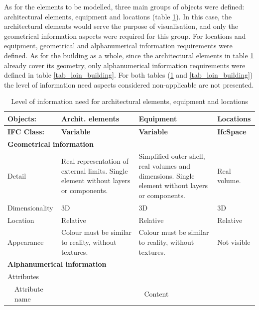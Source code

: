 \documentclass[a4paper, 10pt, twocolumn, twoside]{article}
\begin{document}
As for the elements to be modelled, three main groups of objects were defined: architectural elements, equipment and locations (table \ref{tab_loin_equipment}). In this case, the architectural elements would serve the purpose of visualisation, and only the geometrical information aspects were required for this group. For locations and equipment, geometrical and alphanumerical information requirements were defined. As for the building as a whole, since the architectural elements in table \ref{tab_loin_equipment} already cover its geometry, only alphanumerical information requirements were defined in table \ref{tab_loin_building}. For both tables (\ref{tab_loin_equipment} and \ref{tab_loin_building}) the level of information need aspects \cite{17412-1} considered non-applicable are not presented.

\begin{table}[!htb]
    \renewcommand{\arraystretch}{2}
    \centering
    \caption{Level of information need for architectural elements, equipment and locations}
    \label{tab_loin_equipment}
    \begin{tabular}{p{0.8cm}|p{3.7cm}|p{3.2cm}p{3.2cm}p{2.0cm}}
    \hline
    \multicolumn{2}{l}{\textbf{Objects:}} & \textbf{Archit. elements} & \textbf{Equipment} & \textbf{Locations}\\
    \hline
    \multicolumn{2}{l}{\textbf{IFC Class:}} & \textbf{Variable} & \textbf{Variable} & \textbf{IfcSpace}\\
    \hline
    \multicolumn{5}{l}{\textbf{Geometrical information}} \\
    \hline
    \multicolumn{2}{l}{Detail} & Real representation of external limits. Single element without layers or components. & Simplified outer shell, real volumes and dimensions. Single element without layers or components. & Real volume.\\
    \multicolumn{2}{l}{Dimensionality} & 3D & 3D & 3D\\
    \multicolumn{2}{l}{Location} & Relative & Relative & Relative\\
    \multicolumn{2}{l}{Appearance} & Colour must be similar to reality, without textures. & Colour must be similar to reality, without textures. & Not visible\\
    \hline
    \multicolumn{5}{l}{\textbf{Alphanumerical information}} \\
    \hline
    \multicolumn{5}{l}{Attributes} \\
    \hline
    & Attribute name & \multicolumn{3}{c}{Content}\\

\end{tabular}
\end{table}
\end{document}
